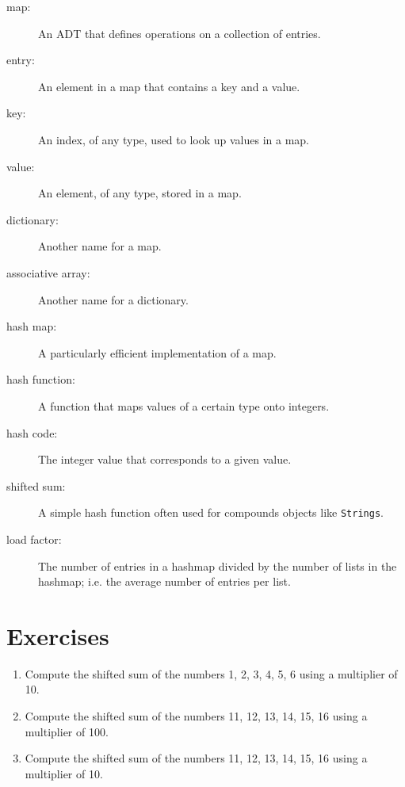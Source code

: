 \begin{description}

\item[map:] An ADT that defines operations on a collection of
entries.

\item[entry:] An element in a map that contains a key and a value.

\item[key:] An index, of any type, used to look up values in a map.

\item[value:] An element, of any type, stored in a map.

\item[dictionary:] Another name for a map.

\item[associative array:] Another name for a dictionary.

\item[hash map:] A particularly efficient implementation of a map.

\item[hash function:] A function that maps values of a certain type
onto integers.

\item[hash code:] The integer value that corresponds to a given value.

\item[shifted sum:] A simple hash function often used for compounds
objects like {\tt Strings}.

\item[load factor:] The number of entries in a hashmap divided
by the number of lists in the hashmap; i.e. the average number
of entries per list.


\end{description}

\section{Exercises}

\begin{exercise}
\begin{enumerate}
\item Compute the shifted sum of the numbers 1, 2, 3, 4, 5, 6 using
a multiplier of 10.

\item Compute the shifted sum of the numbers 11, 12, 13, 14, 15, 16 using
a multiplier of 100.

\item Compute the shifted sum of the numbers 11, 12, 13, 14, 15, 16 using
a multiplier of 10.
\end{enumerate}
\end{exercise}



